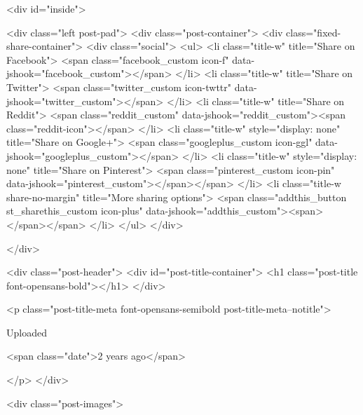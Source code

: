     

        <div id="inside">
        
        <div class="left post-pad">
            <div class="post-container">
                <div class="fixed-share-container">
                    <div class="social">
    <ul>
        <li class="title-w" title="Share on Facebook">
            <span class="facebook_custom icon-f" data-jshook="facebook_custom"></span>
        </li>
        <li class="title-w" title="Share on Twitter">
            <span class="twitter_custom icon-twttr" data-jshook="twitter_custom"></span>
        </li>
        <li class="title-w" title="Share on Reddit">
            <span class="reddit_custom" data-jshook="reddit_custom"><span class="reddit-icon"></span>
        </li>
        <li class="title-w" style="display: none" title="Share on Google+">
            <span class="googleplus_custom icon-ggl" data-jshook="googleplus_custom"></span>
        </li>
        <li class="title-w" style="display: none" title="Share on Pinterest">
            <span class="pinterest_custom icon-pin" data-jshook="pinterest_custom"></span></span>
        </li>
        <li class="title-w share-no-margin" title="More sharing options">
            <span class="addthis_button st_sharethis_custom icon-plus" data-jshook="addthis_custom"><span></span></span>
        </li>
    </ul>
</div>

                </div>

                <div class="post-header">
                    <div id="post-title-container">
                        <h1 class="post-title font-opensans-bold"></h1>
                    </div>

                    <p class="post-title-meta font-opensans-semibold post-title-meta--notitle">
                        

                        
                                                    
                            Uploaded
                        

                                                    <span class="date">2 years ago</span>
                        

                        
                        
                    </p>
                </div>

                <div class="post-images">

                                    
                    
